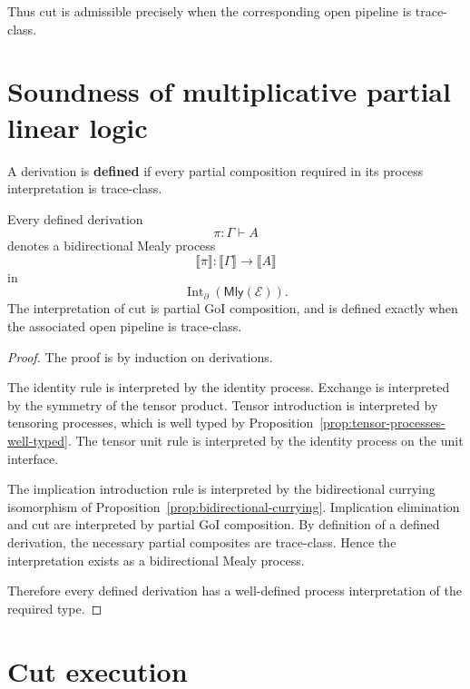 Thus cut is admissible precisely when the corresponding open pipeline is
trace-class.

\section{Soundness of multiplicative partial linear logic}
\label{sec:soundness-multiplicative-partial-linear-logic}

\begin{definition}
\label{def:defined-derivation}
A derivation is \textbf{defined} if every partial composition required in its
process interpretation is trace-class.
\end{definition}

\begin{theorem}[Soundness]
\label{thm:soundness-partial-mll}
Every defined derivation
\[
\pi:\Gamma\vdash A
\]
denotes a bidirectional Mealy process
\[
\llbracket\pi\rrbracket:
\llbracket\Gamma\rrbracket\to\llbracket A\rrbracket
\]
in
\[
\operatorname{Int}_{\partial}(\mathsf{Mly}(\mathcal E)).
\]
The interpretation of cut is partial GoI composition, and is defined exactly
when the associated open pipeline is trace-class.
\end{theorem}

\begin{proof}
The proof is by induction on derivations.

The identity rule is interpreted by the identity process.  Exchange is
interpreted by the symmetry of the tensor product.  Tensor introduction is
interpreted by tensoring processes, which is well typed by
Proposition~\ref{prop:tensor-processes-well-typed}.  The tensor unit rule is
interpreted by the identity process on the unit interface.

The implication introduction rule is interpreted by the bidirectional currying
isomorphism of Proposition~\ref{prop:bidirectional-currying}.  Implication
elimination and cut are interpreted by partial GoI composition.  By definition
of a defined derivation, the necessary partial composites are trace-class.
Hence the interpretation exists as a bidirectional Mealy process.

Therefore every defined derivation has a well-defined process interpretation
of the required type.
\end{proof}

\section{Cut execution}
\label{sec:cut-execution}

